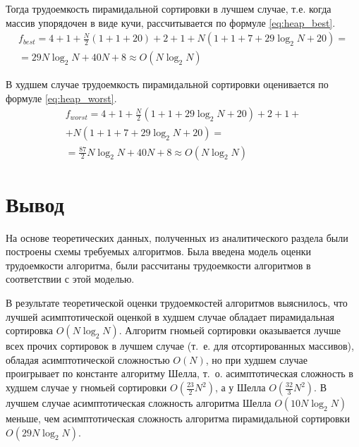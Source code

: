 Тогда трудоемкость пирамидальной сортировки в лучшем случае, т.е. когда массив упорядочен в виде кучи, рассчитывается по формуле \eqref{eq:heap_best}.
\begin{equation}
	\label{eq:heap_best}
	\begin{gathered}
		f_{best} = 4 + 1 + \frac{N}{2}(1 + 1 + 20) + 2 + 1 + N (1 + 1 + 7 + 29 \log_{2}N + 20) = \\
		= 29 N \log_{2}N + 40N + 8 \approx O(N \log_{2}N)
	\end{gathered}
\end{equation}

В худшем случае трудоемкость пирамидальной сортировки оценивается по формуле \eqref{eq:heap_worst}.
\begin{equation}
	\label{eq:heap_worst}
	\begin{gathered}
		f_{worst} = 4 + 1 + \frac{N}{2}(1 + 1 + 29 \log_{2}N + 20) + 2 + 1 +\\
		+ N (1 + 1 + 7 + 29 \log_{2}N + 20) = \\
		= \frac{87}{2} N \log_{2}N + 40N + 8 \approx O(N \log_{2}N)
	\end{gathered}
\end{equation}

\section*{Вывод}
На основе теоретических данных, полученных из аналитического раздела были построены схемы требуемых алгоритмов. 
Была введена модель оценки трудоемкости алгоритма, были рассчитаны трудоемкости алгоритмов в соответствии с этой моделью.

В результате теоретической оценки трудоемкостей алгоритмов выяснилось, что лучшей асимптотической оценкой в худшем случае обладает пирамидальная сортировка $O(N \log_{2}N)$. 
Алгоритм гномьей сортировки оказывается лучше всех прочих сортировок в лучшем случае (т.~е. для отсортированных массивов), обладая асимптотической сложностью $O(N)$, но при худшем случае проигрывает по константе алгоритму Шелла, т.~о. асимптотическая сложность в худшем случае у гномьей сортировки $O(\frac{23}{2}N^2)$, а у Шелла $O(\frac{32}{3} N ^ 2)$. 
В лучшем случае асимптотическая сложность алгоритма Шелла $O(10N\log_2N)$ меньше, чем асимптотическая сложность алгоритма пирамидальной сортировки $O(29N\log_2N)$.
